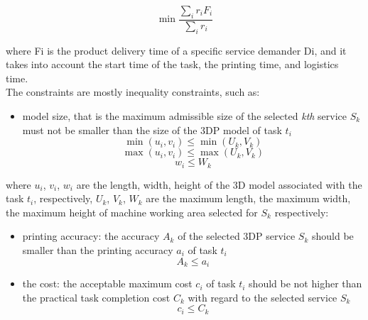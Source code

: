 \begin{equation}
    \label{eq:1}
    \min{\frac{\sum _i r_i F_i}{\sum _i r_i}}
\end{equation}

where Fi is the product delivery time of a specific service demander Di, and it takes into account the start time of the task, the printing time, and logistics time.\\
The constraints are mostly inequality constraints, such as:
\begin{itemize}
    \item model size, that is the maximum admissible size of the selected \emph{kth} service $S_k$ must not be smaller than the size of the 3DP model of task $t_i$ 
    \begin{equation}
        \label{eq:2}
        \min\left(u_i,v_i\right)\leq\min\left(U_k, V_k\right)
    \end{equation}
    \begin{equation}
        \label{eq:3}
        \max\left(u_i,v_i\right)\leq\max\left(U_k, V_k\right)
    \end{equation}
    \begin{equation}
        \label{eq:4}
        w_i \leq W_k
    \end{equation}
\end{itemize}
where $u_i$, $v_i$, $w_i$ are the length, width, height of the 3D model associated with the task $t_i$, respectively, $U_k$, $V_k$, $W_k$ are the maximum length, the maximum width, the maximum height of machine working area selected for $S_k$ respectively:
\begin{itemize}
    \item printing accuracy: the accuracy $A_k$ of the selected 3DP service $S_k$ should be smaller than the printing accuracy $a_i$ of task $t_i$ \begin{equation}\label{eq:5}A_k \leq a_i \end{equation}
    \item the cost: the acceptable maximum cost $c_i$ of task $t_i$ should be not higher than the practical task completion cost $C_k$ with regard to the selected service $S_k$ \begin{equation}\label{eq:6}c_i \leq C_k \end{equation}
\end{itemize}

